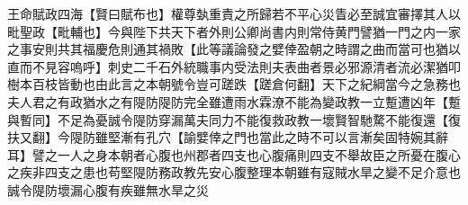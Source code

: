 王命賦政四海【賢曰賦布也】權尊埶重責之所歸若不平心災眚必至誠宜審擇其人以毗聖政【毗輔也】今與陛下共天下者外則公卿尚書内則常侍黄門譬猶一門之内一家之事安則共其福慶危則通其禍敗【此等議論發之嬖倖盈朝之時謂之曲而當可也猶以直而不見容嗚呼】刺史二千石外統職事内受法則夫表曲者景必邪源清者流必潔猶叩樹本百枝皆動也由此言之本朝號令豈可蹉跌【蹉倉何翻】天下之紀綱當今之急務也夫人君之有政猶水之有隄防隄防完全雖遭雨水霖潦不能為變政教一立蹔遭凶年【蹔與暫同】不足為憂誠令隄防穿漏萬夫同力不能復救政教一壞賢智馳騖不能復還【復扶又翻】今隄防雖堅漸有孔穴【諭嬖倖之門也當此之時不可以言漸矣固特婉其辭耳】譬之一人之身本朝者心腹也州郡者四支也心腹痛則四支不舉故臣之所憂在腹心之疾非四支之患也苟堅隄防務政教先安心腹整理本朝雖有寇賊水旱之變不足介意也誠令隄防壞漏心腹有疾雖無水旱之災